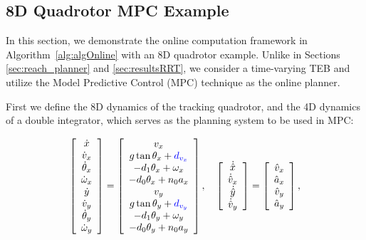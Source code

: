\subsection{8D Quadrotor MPC Example \label{sec:resultsMPC}}

In this section, we demonstrate the online computation framework in Algorithm~\ref{alg:algOnline} with an 8D quadrotor example. Unlike in Sections \ref{sec:reach_planner} and \ref{sec:resultsRRT}, we consider a time-varying TEB and utilize the Model Predictive Control (MPC) technique as the online planner. 

First we define the 8D dynamics of the tracking quadrotor, and the 4D dynamics of a double integrator, which serves as the planning system to be used in MPC:

\begin{equation}
\label{eq:Quad8D_dyn}
\begin{aligned}
\begin{array}{c}
\left[
\begin{array}{c}
\dot x\\
\dot v_x\\
\dot \theta_x\\
\dot \omega_x\\
\dot y\\
\dot v_y\\
\dot \theta_y\\
\dot \omega_y
\end{array}
\right]
=
\left[
\begin{array}{c}
v_x\\
g \tan \theta_x + \MCnote{d_{v_x}}\\
-d_1 \theta_x + \omega_x\\
-d_0 \theta_x + n_0 a_x\\
v_y\\
g \tan \theta_y + \MCnote{d_{v_y}}\\
-d_1 \theta_y + \omega_y\\
-d_0 \theta_y + n_0 a_y
\end{array}
\right], \quad
\left[
\begin{array}{c}
\dot {\hat x}\\
\dot {\hat v}_x\\
\dot {\hat y}\\
\dot {\hat v}_y\\
\end{array}
\right] 
=
\left[
\begin{array}{c}
\hat v_x\\
\hat a_x\\
\hat v_y\\
\hat a_y\\
\end{array}
\right],
\end{array}\\
\end{aligned}
\end{equation}

